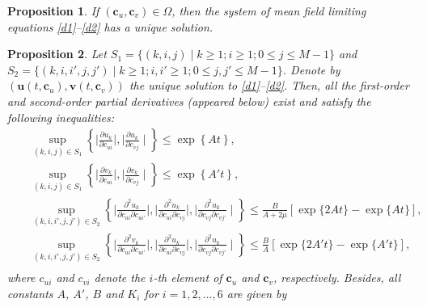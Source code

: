 \documentclass[12pt]{article}
\newtheorem{proposition}{Proposition}[section]
\newcommand{\blue}[1]{\textcolor{blue}{#1}}
\begin{document}
\begin{proposition}\label{p2.1}
If $(\textbf{c}_{u},\textbf{c}_{v})\in \Omega$, then the system of mean field limiting equations \eqref{d1}--\eqref{d2} has a unique solution.
\end{proposition}

\begin{proposition}\label{pd}
Let $S_1=\{(k,i,j)\mid k\geq 1;i\geq 1; 0\leq j\leq M-1\}$ and $S_2=\{(k,i,i',j,j')\mid k\geq 1; i,i'\geq 1; 0\leq j,j'\leq M-1\}$. Denote by $(\textbf{u}(t,\textbf{c}_{u}),\textbf{v}(t,\textbf{c}_{v}))$  the unique solution to \eqref{d1}--\eqref{d2}. Then, all the first-order and second-order partial derivatives (appeared below) exist and satisfy the following inequalities:
\begin{eqnarray*}
  \label{pd1} &&\sup\limits_{(k,i,j)\in S_1}\left\{\mid \frac{\partial u_{k}}{\partial c_{ui}}\mid,\mid \frac{\partial u_{k}}{\partial c_{vj}}\mid\right\}\leq\exp \left\{At\right\}, \\[4mm]
  \label{pd2} &&\sup\limits_{(k,i,j)\in S_1}\left\{\mid \frac{\partial v_{k}}{\partial c_{ui}}\mid,\mid \frac{\partial v_{k}}{\partial c_{vj}}\mid\right\}\leq\exp\left\{A't\right\},\\[4mm]
  \label{pd3}&&\sup\limits_{(k,i,i',j,j')\in S_2
  }\left\{\mid\frac{\partial^2u_k}{\partial c_{ui}\partial c_{ui'}}\mid,\mid\frac{\partial^2u_k}{\partial c_{ui}\partial c_{vj}}\mid,\mid\frac{\partial^2u_k}{\partial c_{vj}\partial c_{vj'}}\mid\right\}\leq\frac{B}{A+2\mu}\left[\exp\{2At\}-\exp\{At\}\right],\\[4mm]
  &&\sup\limits_{(k,i,i',j,j')\in S_2
  }\left\{\mid\frac{\partial^2v_k}{\partial c_{ui}\partial c_{ui'}}\mid,\mid\frac{\partial^2u_k}{\partial c_{ui}\partial c_{vj}}\mid,\mid\frac{\partial^2u_k}{\partial c_{vj}\partial c_{vj'}}\mid\right\}\leq\frac{B}{A}\left[\exp\{2A't\}-\exp\{A't\}\right],\\[4mm]
\end{eqnarray*}
where $c_{ui}$ and $c_{vi}$ denote the $i$-th element of $\textbf{c}_{u}$ and $\textbf{c}_{v}$, respectively. Besides, all constants $A$, $A'$, $B$ and $K_i$ for $i=1, 2, \ldots, 6$ are given by %

\end{proposition}
\end{document}
